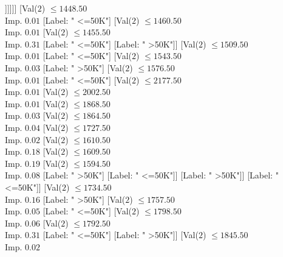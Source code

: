 \documentclass[margin=10pt]{standalone}
\begin{document}
\begin{forest}
																					[Label: " <=50K"]]]]]]
																[Val($2$) $ \leq 1448.50$ \\ Imp. $0.01$
																	[Label: " <=50K"]
																	[Val($2$) $ \leq 1460.50$ \\ Imp. $0.01$
																		[Val($2$) $ \leq 1455.50$ \\ Imp. $0.31$
																			[Label: " <=50K"]
																			[Label: " >50K"]]
																		[Val($2$) $ \leq 1509.50$ \\ Imp. $0.01$
																			[Label: " <=50K"]
																			[Val($2$) $ \leq 1543.50$ \\ Imp. $0.03$
																				[Label: " >50K"]
																				[Val($2$) $ \leq 1576.50$ \\ Imp. $0.01$
																					[Label: " <=50K"]
																					[Val($2$) $ \leq 2177.50$ \\ Imp. $0.01$
																						[Val($2$) $ \leq 2002.50$ \\ Imp. $0.01$
																							[Val($2$) $ \leq 1868.50$ \\ Imp. $0.03$
																								[Val($2$) $ \leq 1864.50$ \\ Imp. $0.04$
																									[Val($2$) $ \leq 1727.50$ \\ Imp. $0.02$
																										[Val($2$) $ \leq 1610.50$ \\ Imp. $0.18$
																											[Val($2$) $ \leq 1609.50$ \\ Imp. $0.19$
																												[Val($2$) $ \leq 1594.50$ \\ Imp. $0.08$
																													[Label: " >50K"]
																													[Label: " <=50K"]]
																												[Label: " >50K"]]
																											[Label: " <=50K"]]
																										[Val($2$) $ \leq 1734.50$ \\ Imp. $0.16$
																											[Label: " >50K"]
																											[Val($2$) $ \leq 1757.50$ \\ Imp. $0.05$
																												[Label: " <=50K"]
																												[Val($2$) $ \leq 1798.50$ \\ Imp. $0.06$
																													[Val($2$) $ \leq 1792.50$ \\ Imp. $0.31$
																														[Label: " <=50K"]
																														[Label: " >50K"]]
																													[Val($2$) $ \leq 1845.50$ \\ Imp. $0.02$

\end{forest}
\end{document}
